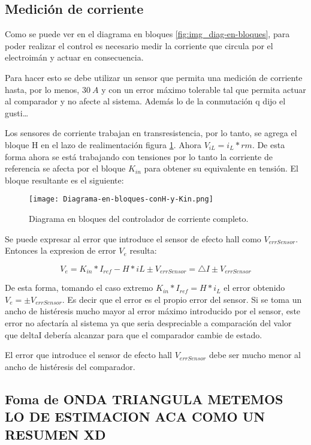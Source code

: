 \subsection{Medición de corriente}


Como se puede ver en el diagrama en bloques \ref{fig:img_diag-en-bloques}, para poder realizar el control es necesario medir la corriente que circula por el electroimán y actuar en consecuencia.


Para hacer esto se debe utilizar un sensor que permita una medición de corriente hasta, por lo menos, $30\:A$  y con un error máximo tolerable tal que permita actuar al comparador y no afecte al sistema. Además lo de la conmutación q dijo el gusti…

Los sensores de corriente trabajan en transresistencia, por lo tanto, se agrega el bloque H en el lazo de realimentación figura \ref{fig:img_diag-en-bloques-conH-y-Kin}. Ahora $V_{iL}=i_{L}*rm$. De esta forma ahora se está trabajando con tensiones por lo tanto la corriente de referencia se afecta por el bloque $K_{in}$ para obtener su equivalente en tensión. El bloque resultante es el siguiente:

\begin{figure}[H]
	\centering
	\texttt{[image: Diagrama-en-bloques-conH-y-Kin.png]}
	\caption{Diagrama en bloques del controlador de corriente completo.}
	\label{fig:img_diag-en-bloques-conH-y-Kin}
\end{figure}

Se puede expresar al error que introduce el sensor de efecto hall como $V_{errSensor}$. Entonces la expresion de error $V_{e}$ resulta: 

\begin{equation}\label{eq_error_ve}
	V_{e}= K_{in}*I_{ref}-H*iL\pm V_{errSensor}=\triangle I \pm V_{errSensor}
\end{equation}


De esta forma, tomando el  caso extremo $K_{in}*I_{ref}=H*i_{L}$ el error obtenido $V_{e}=\pm V_{errSensor}$.
Es decir que el error es el propio error del sensor. Si se toma un ancho de histéresis mucho mayor al error máximo introducido por el sensor, este error no afectaría al sistema ya que seria despreciable a comparación del valor que deltaI debería alcanzar para que el comparador cambie de estado.

El error que introduce el sensor de efecto hall $V_{errSensor}$ debe ser mucho menor al ancho de histéresis del comparador.

\subsection{Foma de ONDA TRIANGULA METEMOS LO DE ESTIMACION ACA COMO UN RESUMEN XD}

